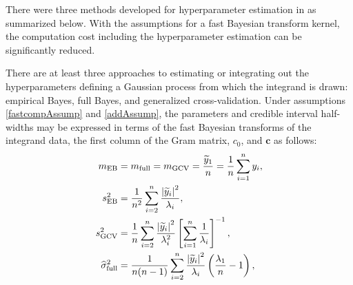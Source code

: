\documentclass{svjour3}                     %
\newcommand{\bm}[1]{\boldsymbol{#1}}
\newcommand{\vc}{\bm{c}}
\newcommand{\MLE}{\textup{EB}}
\newcommand{\full}{\textup{full}}
\newcommand{\GCV}{\textup{GCV}}
\def\abs#1{\ensuremath{\left \lvert #1 \right \rvert}}
\begin{document}
 

There were three methods developed for hyperparameter estimation in \cite{JagHic19a} as summarized below. With the assumptions for a fast Bayesian transform kernel,
the computation cost including the hyperparameter estimation can be significantly reduced.

\begin{theorem} \label{thm:param} There are at least three approaches to estimating or integrating out the hyperparameters defining a Gaussian process from which the integrand is drawn: empirical Bayes, full Bayes, and generalized cross-validation.  
	Under assumptions \eqref{fastcompAssump} and \eqref{addAssump}, the parameters and credible interval half-widths 
	may be expressed in terms of the fast Bayesian transforms of the integrand data, the first column of the Gram matrix, $c_0$, and $\vc$ as follows:
	\begin{subequations}
		\begin{align}
		\nonumber
		m_\MLE &=  m_{\full} = m_{\GCV} =  \frac{\widetilde{y}_1}{n} = \frac 1n \sum_{i=1}^n y_i,
		\\
		\nonumber
		s^2_\MLE 
		& =
		\frac{1}{n^2} 
		\sum_{i=2}^n \frac{\abs{\widetilde{y}_i}^2}{\lambda_i},  \\
		\nonumber 
		s^2_{\textup{GCV}} & =  \frac 1{n} \sum_{i=2}^n \frac{\abs{\widetilde{y}_i}^2}{\lambda_i^2}  \left [ \sum_{i=1}^n \frac{1}{\lambda_i} \right]^{-1}, \\
		\nonumber
		\widehat{\sigma}^2_{\textup{full}} &= \frac{1}{n(n-1)} \sum_{i=2}^n \frac{\abs{\widetilde{y}_i}^2}{\lambda_i}  \left(\frac{\lambda_1}{n}  - 1  \right), 
		\end{align}
	\end{subequations}
	\begin{subequations}
		\label{fastTheta}
		\begin{align}
		\label{fastThetaMLE}

\end{align}
\end{subequations}
\end{theorem}
\end{document}
